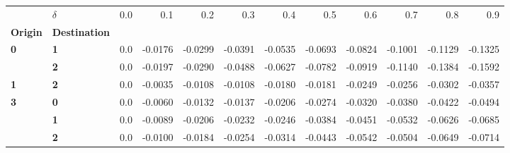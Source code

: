 \begin{tabular}{llrrrrrrrrrr}
\toprule
    & \textbf{\(\delta\)} &  0.0 &     0.1 &     0.2 &     0.3 &     0.4 &     0.5 &     0.6 &     0.7 &     0.8 &     0.9 \\
\textbf{Origin} & \textbf{Destination} &      &         &         &         &         &         &         &         &         &         \\
\midrule
\textbf{0} & \textbf{1} &  0.0 & -0.0176 & -0.0299 & -0.0391 & -0.0535 & -0.0693 & -0.0824 & -0.1001 & -0.1129 & -0.1325 \\
  & \textbf{2} &  0.0 & -0.0197 & -0.0290 & -0.0488 & -0.0627 & -0.0782 & -0.0919 & -0.1140 & -0.1384 & -0.1592 \\
\textbf{1} & \textbf{2} &  0.0 & -0.0035 & -0.0108 & -0.0108 & -0.0180 & -0.0181 & -0.0249 & -0.0256 & -0.0302 & -0.0357 \\
\textbf{3} & \textbf{0} &  0.0 & -0.0060 & -0.0132 & -0.0137 & -0.0206 & -0.0274 & -0.0320 & -0.0380 & -0.0422 & -0.0494 \\
  & \textbf{1} &  0.0 & -0.0089 & -0.0206 & -0.0232 & -0.0246 & -0.0384 & -0.0451 & -0.0532 & -0.0626 & -0.0685 \\
  & \textbf{2} &  0.0 & -0.0100 & -0.0184 & -0.0254 & -0.0314 & -0.0443 & -0.0542 & -0.0504 & -0.0649 & -0.0714 \\
\bottomrule
\end{tabular}

